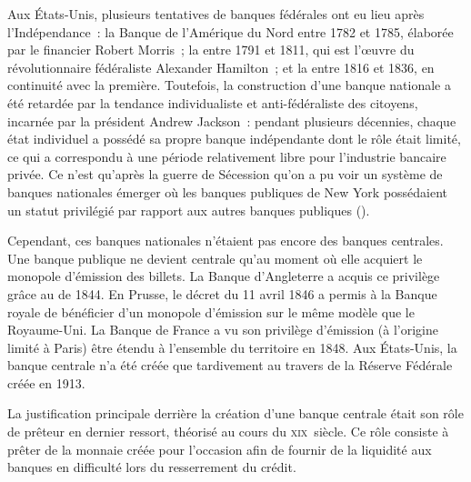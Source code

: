 Aux États-Unis, plusieurs tentatives de banques fédérales ont eu lieu après l'Indépendance~: la Banque de l'Amérique du Nord entre 1782 et 1785, élaborée par le financier Robert Morris~; la  entre 1791 et 1811, qui est l'œuvre du révolutionnaire fédéraliste Alexander Hamilton~; et la  entre 1816 et 1836, en continuité avec la première. Toutefois, la construction d'une banque nationale a été retardée par la tendance individualiste et anti-fédéraliste des citoyens, incarnée par la président Andrew Jackson~: pendant plusieurs décennies, chaque état individuel a possédé sa propre banque indépendante dont le rôle était limité, ce qui a correspondu à une période relativement libre pour l'industrie bancaire privée. Ce n'est qu'après la guerre de Sécession qu'on a pu voir un système de banques nationales émerger où les banques publiques de New York possédaient un statut privilégié par rapport aux autres banques publiques (). %


Cependant, ces banques nationales n'étaient pas encore des banques centrales. Une banque publique ne devient centrale qu'au moment où elle acquiert le monopole d'émission des billets. La Banque d'Angleterre a acquis ce privilège grâce au  de 1844. En Prusse, le décret du 11 avril 1846 a permis à la Banque royale de bénéficier d'un monopole d'émission sur le même modèle que le Royaume-Uni. La Banque de France a vu son privilège d'émission (à l'origine limité à Paris) être étendu à l'ensemble du territoire en 1848. Aux États-Unis, la banque centrale n'a été créée que tardivement au travers de la Réserve Fédérale créée en 1913.

La justification principale derrière la création d'une banque centrale était son rôle de prêteur en dernier ressort, théorisé au cours du \textsc{xix}\ieme{}~siècle. Ce rôle consiste à prêter de la monnaie créée pour l'occasion afin de fournir de la liquidité aux banques en difficulté lors du resserrement du crédit.

